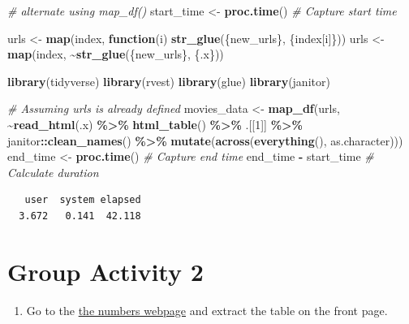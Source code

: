 \documentclass[
]{book}
\newenvironment{Shaded}{\begin{snugshade}}{\end{snugshade}}
\newcommand{\CommentTok}[1]{\textcolor[rgb]{0.56,0.35,0.01}{\textit{#1}}}
\newcommand{\ControlFlowTok}[1]{\textcolor[rgb]{0.13,0.29,0.53}{\textbf{#1}}}
\newcommand{\DecValTok}[1]{\textcolor[rgb]{0.00,0.00,0.81}{#1}}
\newcommand{\FunctionTok}[1]{\textcolor[rgb]{0.13,0.29,0.53}{\textbf{#1}}}
\newcommand{\NormalTok}[1]{#1}
\newcommand{\OtherTok}[1]{\textcolor[rgb]{0.56,0.35,0.01}{#1}}
\newcommand{\SpecialCharTok}[1]{\textcolor[rgb]{0.81,0.36,0.00}{\textbf{#1}}}
\providecommand{\tightlist}{%
  \setlength{\itemsep}{0pt}\setlength{\parskip}{0pt}}
\begin{document}
\begin{Shaded}
\begin{Highlighting}[]
\CommentTok{\# alternate using map\_df()}
\NormalTok{start\_time }\OtherTok{\textless{}{-}} \FunctionTok{proc.time}\NormalTok{() }\CommentTok{\# Capture start time}

\NormalTok{urls }\OtherTok{\textless{}{-}} \FunctionTok{map}\NormalTok{(index, }\ControlFlowTok{function}\NormalTok{(i) }\FunctionTok{str\_glue}\NormalTok{(\{new\_urls\}, \{index[i]\}))}
\NormalTok{urls }\OtherTok{\textless{}{-}} \FunctionTok{map}\NormalTok{(index, }\SpecialCharTok{\textasciitilde{}}\FunctionTok{str\_glue}\NormalTok{(\{new\_urls\}, \{.x\}))}

\FunctionTok{library}\NormalTok{(tidyverse)}
\FunctionTok{library}\NormalTok{(rvest)}
\FunctionTok{library}\NormalTok{(glue)}
\FunctionTok{library}\NormalTok{(janitor)}

\CommentTok{\# Assuming \textquotesingle{}urls\textquotesingle{} is already defined}
\NormalTok{movies\_data }\OtherTok{\textless{}{-}} \FunctionTok{map\_df}\NormalTok{(urls, }\SpecialCharTok{\textasciitilde{}}\FunctionTok{read\_html}\NormalTok{(.x) }\SpecialCharTok{\%\textgreater{}\%}
                        \FunctionTok{html\_table}\NormalTok{() }\SpecialCharTok{\%\textgreater{}\%}
\NormalTok{                        .[[}\DecValTok{1}\NormalTok{]] }\SpecialCharTok{\%\textgreater{}\%}
\NormalTok{                        janitor}\SpecialCharTok{::}\FunctionTok{clean\_names}\NormalTok{() }\SpecialCharTok{\%\textgreater{}\%} 
                        \FunctionTok{mutate}\NormalTok{(}\FunctionTok{across}\NormalTok{(}\FunctionTok{everything}\NormalTok{(), as.character))) }
\NormalTok{end\_time }\OtherTok{\textless{}{-}} \FunctionTok{proc.time}\NormalTok{() }\CommentTok{\# Capture end time}
\NormalTok{end\_time }\SpecialCharTok{{-}}\NormalTok{ start\_time }\CommentTok{\# Calculate duration}
\end{Highlighting}
\end{Shaded}

\begin{verbatim}
   user  system elapsed 
  3.672   0.141  42.118 
\end{verbatim}

\hypertarget{group-activity-2-4}{%
\section{Group Activity 2}\label{group-activity-2-4}}

\begin{enumerate}
\def\labelenumi{\arabic{enumi}.}
\tightlist
\item
  Go to the \href{https://www.scrapethissite.com/pages/forms/}{the numbers webpage} and extract the table on the front page.
\end{enumerate}
\end{document}
